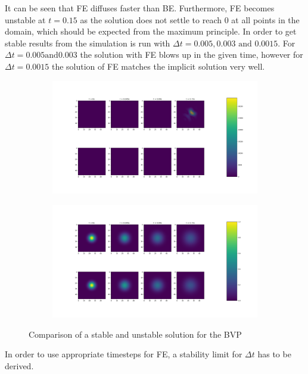 \documentclass{article}
\begin{document}
It can be seen that FE diffuses faster than BE. Furthermore, FE becomes unstable at $t=0.15$ as the solution does not settle to reach 0 at all points in the domain, which should be expected from the maximum principle.
In order to get stable results from the simulation is run with $\Delta t = 0.005, 0.003 \text{ and } 0.0015$. For $\Delta t = 0.005 \text{and} 0.003$ the solution with FE blows up in the given time, however for $\Delta t = 0.0015$ the solution of FE matches the implicit solution very well.
\begin{figure}[H]
	\begin{subfigure}{.5\textwidth}
		\centering
		\includegraphics[width=.9\linewidth]{2unstable.png}
	\end{subfigure}
	\begin{subfigure}{.5\textwidth}
		\centering
		\includegraphics[width=.9\linewidth]{2stable.png}
	\end{subfigure}
\caption{Comparison of a stable and unstable solution for the BVP}
\end{figure}
In order to use appropriate timesteps for FE, a stability limit for $\Delta t$ has to be derived.
\end{document}
